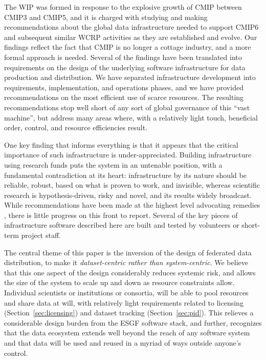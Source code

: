 \documentclass[gmd,manuscript]{copernicus}
\begin{document}
\label{sec:summary}

The WIP was formed in response to the explosive growth of CMIP between
CMIP3 and CMIP5, and it is charged with studying and making
recommendations about the global data infrastructure needed to support
CMIP6 and subsequent similar WCRP activities as they are established
and evolve. Our findings reflect the fact that CMIP is no longer a
cottage industry, and a more formal approach is needed. Several of the
findings have been translated into requirements on the design of the
underlying software infrastructure for data production and
distribution. We have separated infrastructure development into
requirements, implementation, and operations phases, and we have
provided recommendations on the most efficient use of scarce
resources. The resulting recommendations stop well short of any sort
of global governance of this ``vast machine'', but address many areas
where, with a relatively light touch, beneficial order, control, and
resource efficiencies result.

One key finding that informs everything is that it appears that the
critical importance of such infrastructure is under-appreciated.
Building infrastructure using research funds puts the system in an
untenable position, with a fundamental contradiction at its heart:
infrastructure by its nature should be reliable, robust, based on what
is proven to work, and invisible, whereas scientific research is
hypothesis-driven, risky and novel, and its results widely broadcast.
While recommendations have been made at the highest level advocating
remedies \citep[e.g.,][]{ref:nasem2012}, there is little progress on
this front to report. Several of the key pieces of infrastructure
software described here are built and tested by volunteers or
short-term project staff.

The central theme of this paper is the inversion of the design of
federated data distribution, to make it \emph{dataset-centric rather
  than system-centric}. We believe that this one aspect of the design
considerably reduces systemic risk, and allows the size of the system
to scale up and down as resource constraints allow. Individual
scientists or institutions or consortia, will be able to pool
resources and share data at will, with relatively light requirements
related to licensing (Section~\ref{sec:licensing}) and dataset
tracking (Section~\ref{sec:pid}). This relieves a considerable design
burden from the ESGF software stack, and further, recognizes that the
data ecosystem extends well beyond the reach of any software system
and that data will be used and reused in a myriad of ways outside
anyone's control.
\end{document}
